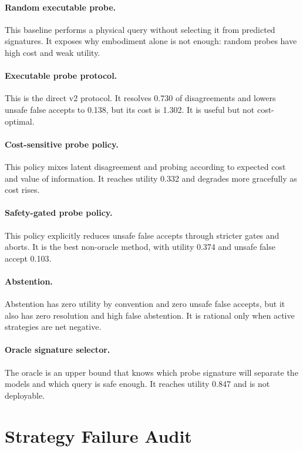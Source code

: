 \documentclass{article}
\begin{document}
\paragraph{Random executable probe.}
This baseline performs a physical query without selecting it from predicted signatures. It exposes why embodiment alone is not enough: random probes have high cost and weak utility.

\paragraph{Executable probe protocol.}
This is the direct v2 protocol. It resolves 0.730 of disagreements and lowers unsafe false accepts to 0.138, but its cost is 1.302. It is useful but not cost-optimal.

\paragraph{Cost-sensitive probe policy.}
This policy mixes latent disagreement and probing according to expected cost and value of information. It reaches utility 0.332 and degrades more gracefully as cost rises.

\paragraph{Safety-gated probe policy.}
This policy explicitly reduces unsafe false accepts through stricter gates and aborts. It is the best non-oracle method, with utility 0.374 and unsafe false accept 0.103.

\paragraph{Abstention.}
Abstention has zero utility by convention and zero unsafe false accepts, but it also has zero resolution and high false abstention. It is rational only when active strategies are net negative.

\paragraph{Oracle signature selector.}
The oracle is an upper bound that knows which probe signature will separate the models and which query is safe enough. It reaches utility 0.847 and is not deployable.

\section{Strategy Failure Audit}
\end{document}

